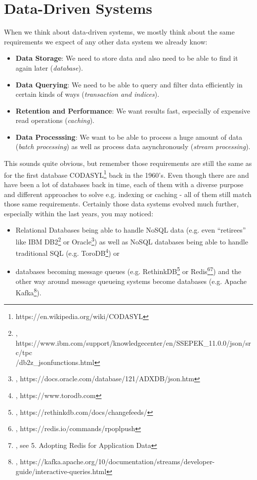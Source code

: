 \section{Data-Driven Systems}
\label{tf_nfreq}
When we think about data-driven systems, we mostly think about the same requirements we expect of any other data system we already know:
\begin{itemize}
	\item \textbf{Data Storage}: We need to store data and also need to be able to find it again later (\textit{database}). 
	\item \textbf{Data Querying}: We need to be able to query and filter data efficiently in certain kinds of ways (\textit{transaction and indices}).
	\item \textbf{Retention and Performance}: We want results fast, especially of expensive read operations (\textit{caching}).
	\item \textbf{Data Processsing}: We want to be able to process a huge amount of data (\textit{batch processing}) as well as process data asynchronously (\textit{stream processing}).\\
\end{itemize}

This sounds quite obvious, but remember those requirements are still the same as for the first database CODASYL\footnote{https://en.wikipedia.org/wiki/CODASYL} back in the 1960's. Even though there are and have been a lot of databases back in time, each of them with a diverse purpose and different approaches to solve e.g. indexing or caching - all of them still match those same requirements. Certainly those data systems evolved much further, especially within the last years, you may noticed:
\begin{itemize}
	\item Relational Databases being able to handle NoSQL data (e.g. even ``retirees'' like IBM DB2\footnote{\cite{IBMDB2JS}, https://www.ibm.com/support/knowledgecenter/en/SSEPEK\_11.0.0/json/src/tpc\\/db2z\_jsonfunctions.html} or Oracle\footnote{\cite{ORCLJS}, https://docs.oracle.com/database/121/ADXDB/json.htm}) as well as NoSQL databases being able to handle traditional SQL (e.g. ToroDB\footnote{\cite{TORODB}, https://www.torodb.com}) or
	\item databases becoming message queues (e.g. RethinkDB\footnote{\cite{RDBMQ}, https://rethinkdb.com/docs/changefeeds/} or Redis\footnote{\cite{RUDMQ}, https://redis.io/commands/rpoplpush}\footnote{\cite{BSARN}, see 5. Adopting Redis for Application Data}) and the other way around message queueing systems become databases (e.g. Apache Kafka\footnote{\cite{KFKQU}, https://kafka.apache.org/10/documentation/streams/developer-guide/interactive-queries.html}).\\
\end{itemize}

